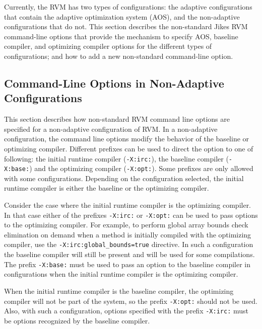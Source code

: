 
Currently, the RVM has two types of configurations:
the adaptive configurations that contain the adaptive optimization 
system (AOS),
and the non-adaptive configurations that do not.  
This section describes the non-standard Jikes RVM command-line options that 
provide the mechanism to specify AOS, baseline compiler, and optimizing compiler options
for the different types of configurations; and 
how to add a new non-standard command-line option.

\subsection{Command-Line Options in Non-Adaptive Configurations}
\label{subsection:nonadaptive:cmdline}

This section describes how non-standard RVM command line options are 
specified for a non-adaptive configuration of RVM.
In a non-adaptive configuration, the command line options modify
the behavior of the baseline or optimizing compiler. 
Different prefixes can be used to direct the option to one of following: the initial runtime 
compiler ({\tt -X:irc:}), 
the baseline compiler ({\tt -X:base:}) and the optimizing
compiler ({\tt -X:opt:}). 
Some prefixes are only allowed with some configurations.
Depending on the configuration selected, the initial runtime compiler is 
either the baseline or the optimizing compiler. 

Consider the case where the initial runtime compiler is the optimizing 
compiler. In that case either of the 
prefixes {\tt -X:irc:} or {\tt -X:opt:} can be used to pass options to
the optimizing compiler. 
For example, to perform global array bounds check elimination on demand
when a method is initially compiled with the optimizing compiler,
use the {\tt -X:irc:global\_bounds=true} directive.
In such a configuration the baseline compiler will
still be present and will be used for some compilations. 
The prefix {\tt -X:base:} must be used to pass an option to the 
baseline compiler in configurations when the initial runtime compiler is 
the optimizing compiler.

When the initial runtime compiler is the baseline compiler, the optimizing
compiler will not be part of the system, so the prefix {\tt -X:opt:} should
not be used. Also, with such a configuration, options specified with the prefix
{\tt -X:irc:} must be options recognized by the baseline compiler.

